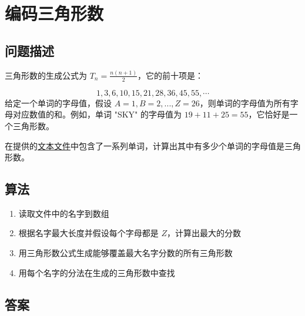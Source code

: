 \section{编码三角形数}
\subsection{问题描述}
\begin{tcolorbox}
	三角形数的生成公式为 $T_n = \frac{n(n+1)}{2}$，它的前十项是：

	\begin{equation*}
		1 , 3 , 6 , 10 , 15 , 21 , 28 , 36 , 45 , 55 , \cdots
	\end{equation*}
	给定一个单词的字母值，假设 $A=1, B=2, ..., Z=26$，则单词的字母值为所有字母对应数值的和。例如，单词 "SKY" 的字母值为
	$19 + 11 + 25 = 55$，它恰好是一个三角形数。

	在提供的\href{https://projecteuler.net/resources/documents/0042_words.txt}{文本文件}中包含了一系列单词，计算出其中有多少个单词的字母值是三角形数。
\end{tcolorbox}
\subsection{算法}
\begin{enumerate}
	\item 读取文件中的名字到数组
	\item 根据名字最大长度并假设每个字母都是 $Z$，计算出最大的分数
	\item 用三角形数公式生成能够覆盖最大名字分数的所有三角形数
	\item 用每个名字的分法在生成的三角形数中查找
\end{enumerate}

\subsection{答案}
